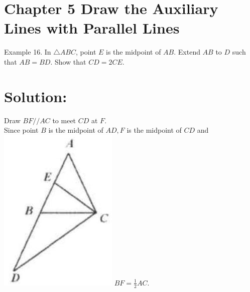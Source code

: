 \documentclass[10pt]{article}
\begin{document}
\section*{Chapter 5 Draw the Auxiliary Lines with Parallel Lines}
Example 16. In \(\triangle A B C\), point \(E\) is the midpoint of \(A B\). Extend \(A B\) to \(D\) such that \(A B=B D\). Show that \(C D=2 C E\).

\section*{Solution:}
Draw \(B F / / A C\) to meet \(C D\) at \(F\).\\
Since point \(B\) is the midpoint of \(A D, F\) is the midpoint of \(C D\) and\\
\includegraphics[max width=\textwidth]{2025_04_17_97bc1f7e44d93c271a88g-118(1)} \(B F=\frac{1}{2} A C\).
\end{document}
